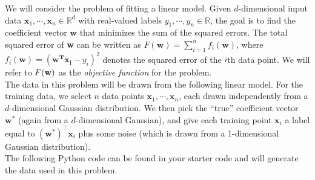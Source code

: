 



We will consider the problem of fitting a linear model. Given
$d$-dimensional input data
$\textbf{x}_1,\dotsb, \textbf{x}_n \in \mathbb{R}^d$ with
real-valued labels $y_1,\dotsb, y_n \in \mathbb{R}$, the goal
is to find the coefficient vector $\textbf{w}$ that minimizes the sum
of the squared errors.  The total squared error of \textbf{w} can be
written as
$F(\mathbf{w})=\sum_{i=1}^{n}f_i(\mathbf{w})$, where
$f_i(\mathbf{w})=(\mathbf{w^T x_i}-y_i)^2$ denotes the
squared error of the $i$th data point. We will refer to $F(\mathbf{w})$ as the \emph{objective function} for the problem.\\

The data in this problem will be drawn from the following linear
model.  For the training data, we select $n$ data points
$\textbf{x}_1,\dotsb, \textbf{x}_n$, each drawn independently
from a $d$-dimensional Gaussian distribution.  We then pick
the ``true'' coefficient vector $\mathbf{w}^*$ (again from a
$d$-dimensional Gaussian), and give each training point
$\mathbf{x}_i$ a label equal to $(\mathbf{w}^*)^{\top}\mathbf{x}_i$
plus some noise (which is drawn from a
1-dimensional Gaussian distribution).\\

The following Python code can be found in your starter code and will generate the data used in this problem.

